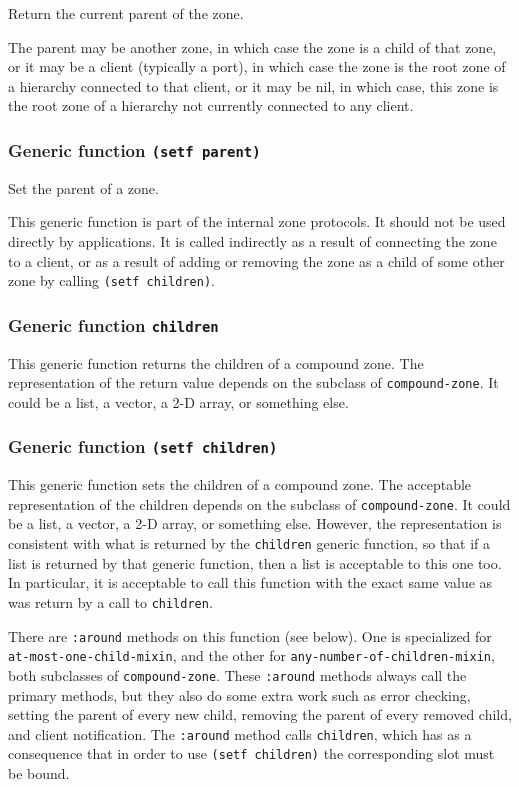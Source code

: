 \documentclass{report}
\begin{document}
Return the current parent of the zone. 

The parent may be another zone, in which case the zone is a child of
that zone, or it may be a client (typically a port), in which case the
zone is the root zone of a hierarchy connected to that client, or it
may be nil, in which case, this zone is the root zone of a hierarchy
not currently connected to any client.

\subsubsection{Generic function \texttt{(setf parent)}}

Set the parent of a zone.

This generic function is part of the internal zone protocols.  It
should not be used directly by applications.  It is called indirectly
as a result of connecting the zone to a client, or as a result of
adding or removing the zone as a child of some other zone by calling
\texttt{(setf children)}.

\subsubsection{Generic function \texttt{children}}

This generic function returns the children of a compound zone.  The
representation of the return value depends on the subclass of
\texttt{compound-zone}.  It could be a list, a vector, a 2-D array, or
something else.

\subsubsection{Generic function \texttt{(setf children)}}

This generic function sets the children of a compound zone.  The
acceptable representation of the children depends on the subclass of
\texttt{compound-zone}.  It could be a list, a vector, a 2-D array, or
something else.  However, the representation is consistent with what
is returned by the \texttt{children} generic function, so that if a list is
returned by that generic function, then a list is acceptable to this
one too.  In particular, it is acceptable to call this function with
the exact same value as was return by a call to \texttt{children}.

There are \texttt{:around} methods on this function (see below).  One
is specialized for \texttt{at-most-one-child-mixin}, and the other for
\texttt{any-number-of-children-mixin}, both subclasses of
\texttt{compound-zone}.  These \texttt{:around} methods always call
the primary methods, but they also do some extra work such as error
checking, setting the parent of every new child, removing the parent
of every removed child, and client notification.  The \texttt{:around}
method calls \texttt{children}, which has as a consequence that in
order to use \texttt{(setf children)} the corresponding slot must be
bound.
\end{document}
